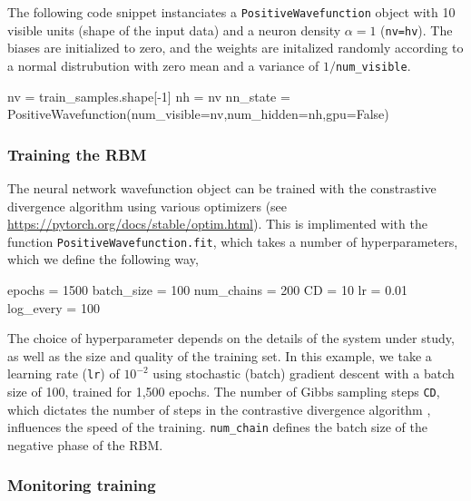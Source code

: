 \documentclass[submission, Phys]{SciPost}
\begin{document}
The following code snippet instanciates a \verb|PositiveWavefunction| object with 10 visible units (shape of the input data) and a neuron density $\alpha=1$ (\verb|nv=hv|).
The biases are initialized to zero, and the weights are initalized randomly according to a normal distrubution with zero mean and a variance of $1/$\verb|num_visible|.

\begin{python}
nv = train_samples.shape[-1]
nh = nv
nn_state = PositiveWavefunction(num_visible=nv,num_hidden=nh,gpu=False)
\end{python}

\subsubsection{Training the RBM}

The neural network wavefunction object can be trained with the constrastive divergence algorithm using various optimizers (see \url{https://pytorch.org/docs/stable/optim.html}).
This is implimented with the function \verb|PositiveWavefunction.fit|, which takes a number of hyperparameters, which we define the following way, 
\begin{python}
epochs     = 1500
batch_size = 100
num_chains = 200
CD         = 10
lr         = 0.01
log_every  = 100
\end{python}
The choice of hyperparameter depends on the details of the system under study, as well as the size and quality of the training set.
In this example, we take a learning rate (\verb|lr|) of $10^{-2}$ using stochastic (batch) gradient descent with a batch size of 100, trained for 1,500 epochs.
The number of Gibbs sampling steps \verb|CD|, which dictates the number of steps in the contrastive divergence algorithm \cite{hinton2002training},
influences the speed of the training. 
\verb|num_chain| defines the batch size of the negative phase of the RBM. %

\subsubsection{Monitoring training}
\end{document}
